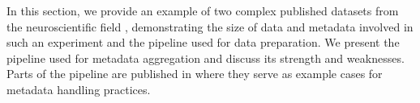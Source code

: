 In this section, we provide an example of two complex published datasets from the neuroscientific field \citep{Brochier_2018}, demonstrating the size of data and metadata involved in such an experiment and the pipeline used for data preparation. We present the pipeline used for metadata aggregation and discuss its strength and weaknesses. Parts of the pipeline are published in \cite{Zehl_2016} where they serve as example cases for metadata handling practices.


% 
% 
% 
% 


% 
% 
% 
% 
% 



